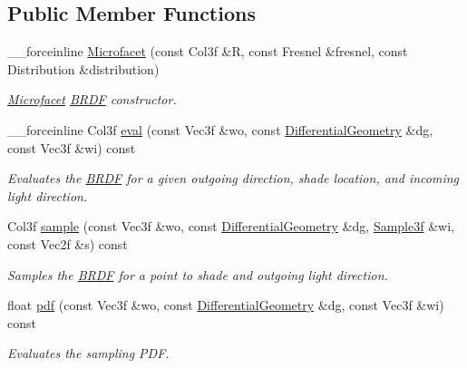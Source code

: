 \subsection*{Public Member Functions}
\begin{DoxyCompactItemize}
\item 
\_\-\_\-forceinline \hyperlink{classembree_1_1_microfacet_a64046281562efbd298fca3d27161395f}{Microfacet} (const Col3f \&R, const Fresnel \&fresnel, const Distribution \&distribution)
\begin{DoxyCompactList}\small\item\em \hyperlink{classembree_1_1_microfacet}{Microfacet} \hyperlink{classembree_1_1_b_r_d_f}{BRDF} constructor. \item\end{DoxyCompactList}\item 
\_\-\_\-forceinline Col3f \hyperlink{classembree_1_1_microfacet_a7de0e49c1425eff3003c40f875e43466}{eval} (const Vec3f \&wo, const \hyperlink{structembree_1_1_differential_geometry}{DifferentialGeometry} \&dg, const Vec3f \&wi) const 
\begin{DoxyCompactList}\small\item\em Evaluates the \hyperlink{classembree_1_1_b_r_d_f}{BRDF} for a given outgoing direction, shade location, and incoming light direction. \item\end{DoxyCompactList}\item 
Col3f \hyperlink{classembree_1_1_microfacet_a9e9f979b2aaaecb899110bd9e9c2f7ef}{sample} (const Vec3f \&wo, const \hyperlink{structembree_1_1_differential_geometry}{DifferentialGeometry} \&dg, \hyperlink{structembree_1_1_sample}{Sample3f} \&wi, const Vec2f \&s) const 
\begin{DoxyCompactList}\small\item\em Samples the \hyperlink{classembree_1_1_b_r_d_f}{BRDF} for a point to shade and outgoing light direction. \item\end{DoxyCompactList}\item 
float \hyperlink{classembree_1_1_microfacet_a72fac81dfc79a57c4f719a1b62942ea3}{pdf} (const Vec3f \&wo, const \hyperlink{structembree_1_1_differential_geometry}{DifferentialGeometry} \&dg, const Vec3f \&wi) const 
\begin{DoxyCompactList}\small\item\em Evaluates the sampling PDF. \item\end{DoxyCompactList}\end{DoxyCompactItemize}


